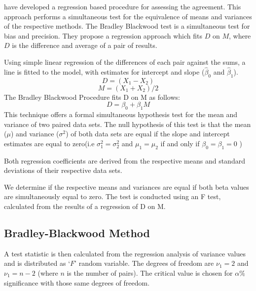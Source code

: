\documentclass[12pt, a4paper]{report}
\theoremstyle{plain}
\theoremstyle{definition}
\theoremstyle{remark}
\begin{document}
	
	\citet{BB89} have developed a regression based procedure for
	assessing the agreement. This approach performs a simultaneous test for the equivalence of
	means and variances of the respective methods. The Bradley Blackwood test is a simultaneous test for bias and
	precision. They propose a regression approach which fits $D$ on $M$, where $D$ is the difference and average of a pair of results. 
	
	Using simple linear regression of the differences of each pair against the sums, a line is fitted to the model, with estimates for intercept and slope ($\hat{\beta}_{0}$ and $\hat{\beta}_{1}$).
	\begin{equation}
	D = (X_{1}-X_{2})
	\end{equation}
	\begin{equation}
	M = (X_{1} + X_{2}) /2
	\end{equation}
	The Bradley Blackwood Procedure fits D on M as follows:\\
	\begin{equation}
	D = \beta_{0} + \beta_{1}M
	\end{equation}
	This technique offers a formal simultaneous hypothesis test for the
	mean and variance of two paired data sets.  The null
	hypothesis of this test is that the mean ($\mu$) and variance
	($\sigma^{2}$) of both data sets are equal if the slope and
	intercept estimates are equal to zero(i.e $\sigma^{2}_{1} =
	\sigma^{2}_{2}$ and $\mu_{1}=\mu_{2}$ if and only if $\beta_{0}=
	\beta_{1}=0$ )
	
	Both regression coefficients are derived from the respective means and
	standard deviations of their respective data sets.
	
	We determine if the respective means and variances are equal if
	both beta values are simultaneously equal to zero. The test is
	conducted using an F test, calculated from the results of a
	regression of D on M.
	
	
	\subsection{Bradley-Blackwood Method}
	
	
	A test statistic is then calculated from the regression analysis
	of variance values \citep{BB89} and is distributed as `$F$' random
	variable. The degrees of freedom are $\nu_{1}=2$ and $\nu_{1}=n-2$
	(where $n$ is the number of pairs). The critical value is chosen
	for $\alpha\%$ significance with those same degrees of freedom.
	
\end{document}
